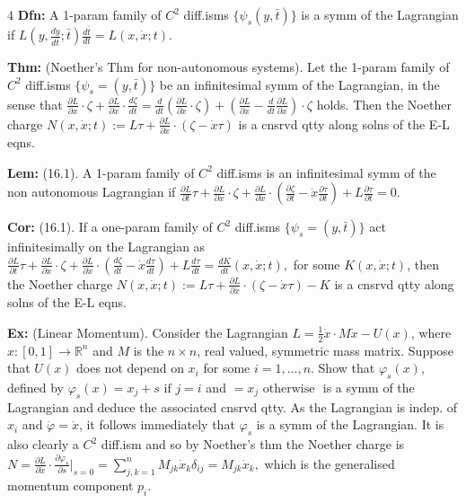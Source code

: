 \documentclass[landscape, 8pt]{extarticle}
\begin{document}
\begin{multicols*}{4}
		\textbf{Dfn:} A 1-param family of $C^2$ diff.isms $\{\psi_s(y,\bar{t})\}$ is a symm of the Lagrangian if
		$
		L\!\left(y,\frac{dy}{d\bar{t}};\bar{t}\right)\frac{d\bar{t}}{dt}=L(x,\dot{x};t).
		$
		
		\textbf{Thm:} (Noether's Thm for non-autonomous systems). Let the 1-param family of $C^2$ diff.isms $\{\psi_s=(y,\bar{t})\}$ be an infinitesimal symm of the Lagrangian, in the sense that
		$
		\frac{\partial L}{\partial x}\cdot\zeta+\frac{\partial L}{\partial\dot{x}}\cdot\frac{d\zeta}{dt}=\frac{d}{dt}\!\left(\frac{\partial L}{\partial\dot{x}}\cdot\zeta\right)+\left(\frac{\partial L}{\partial x}-\frac{d}{dt}\frac{\partial L}{\partial\dot{x}}\right)\cdot\zeta
		$
		holds. Then the Noether charge
		$
		N(x,\dot{x};t):=L\tau+\frac{\partial L}{\partial\dot{x}}\cdot(\zeta-\dot{x}\tau)
		$
		is a cnsrvd qtty along solns of the E-L eqns.
		
		\textbf{Lem:} (16.1). A 1-param family of $C^2$ diff.isms is an infinitesimal symm of the non autonomous Lagrangian if
		$
		\frac{\partial L}{\partial t}\tau+\frac{\partial L}{\partial x}\cdot\zeta+\frac{\partial L}{\partial\dot{x}}\cdot\left(\frac{\partial\zeta}{\partial t}-\dot{x}\frac{\partial\tau}{\partial t}\right)+L\frac{\partial\tau}{\partial t}=0.
		$
		
		\textbf{Cor:} (16.1). If a one-param family of $C^2$ diff.isms $\{\psi_s=(y,\bar{t})\}$ act infinitesimally on the Lagrangian as
		$
		\frac{\partial L}{\partial t}\tau+\frac{\partial L}{\partial x}\cdot\zeta+\frac{\partial L}{\partial\dot{x}}\cdot\left(\frac{d\zeta}{dt}-\dot{x}\frac{d\tau}{dt}\right)+L\frac{d\tau}{dt}=\frac{dK}{dt}(x,\dot{x};t),
		$
		for some $K(x,\dot{x};t)$, then the Noether charge
		$
		N(x,\dot{x};t):=L\tau+\frac{\partial L}{\partial\dot{x}}\cdot(\zeta-\dot{x}\tau)-K
		$
		is a cnsrvd qtty along solns of the E-L eqns.
		
		\textbf{Ex:} (Linear Momentum). Consider the Lagrangian $L=\frac{1}{2}\dot{x}\cdot M\dot{x}-U(x)$, where $x:[0,1]\to\mathbb{R}^n$ and $M$ is the $n\times n$, real valued, symmetric mass matrix. Suppose that $U(x)$ does not depend on $x_i$ for some $i=1,\ldots,n$. Show that $\varphi_s(x)$, defined by
		$
		\varphi_s(x)= x_j+s \text{ if }j=i$ and $=x_j\text{ otherwise }
		$
		is a symm of the Lagrangian and deduce the associated cnsrvd qtty. As the Lagrangian is indep. of $x_i$ and $\dot\varphi=\dot{x}$, it follows immediately that $\varphi_s$ is a symm of the Lagrangian. It is also clearly a $C^2$ diff.ism and so by Noether's thm the Noether charge is
		$
		N=\frac{\partial L}{\partial\dot{x}}\cdot\frac{\partial\varphi_s}{\partial s}\bigg|_{s=0}=\sum_{j,k=1}^n M_{jk}\dot{x}_k\delta_{ij}=M_{jk}\dot{x}_k,
		$
		which is the generalised momentum component $p_i$.
		

\end{multicols*}
\end{document}
